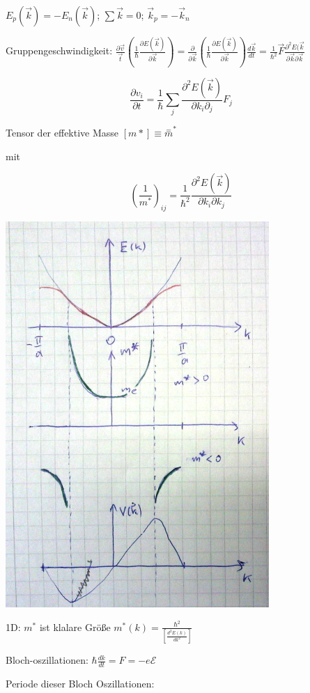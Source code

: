 \(E_p(\vec k) = -E_n(\vec k)\); \(\sum \vec k = 0\); \(\vec k_p = - \vec k_n \)

Gruppengeschwindigkeit: \(\frac{\partial \vec v}{\vec t}(\frac{1}{\hbar}\frac{\partial E(\vec k)}{\partial \vec k})=\frac{\partial}{\partial \vec k}(\frac{1}{\hbar}\frac{\partial E(\vec k)}{\partial \vec k})\frac{d\vec k}{dt}=\frac{1}{\hbar^2}\vec F\frac{\partial^2 E(\vec k}{\partial \vec k\partial\vec k}\)

\[\frac{\partial v_i}{\partial t} = \frac{1}{\hbar}\sum_j \frac{\partial^2 E(\vec k)}{\partial k_i\partial_j}F_j\]

Tensor der effektive Masse \([m*]\equiv \stackrel{\mathrm{=}}m^* \)

mit 

\[\left(\frac{1}{m^*}\right)_{ij}=\frac{1}{\hbar^2}\frac{\partial^2 E(\vec k)}{\partial k_i\partial k_j}\]


\includegraphics[width=0.75\textwidth]{kap10_03.png}

1D: \(m^*\) ist klalare Größe \(m^*(k) = \frac{\hbar^2}{[\frac{d^2E(k)}{dk^2}]}\)

Bloch-oszillationen: \(\hbar \frac{dk}{dt} = F = -e\mathcal E\)


Periode dieser Bloch Oszillationen:

